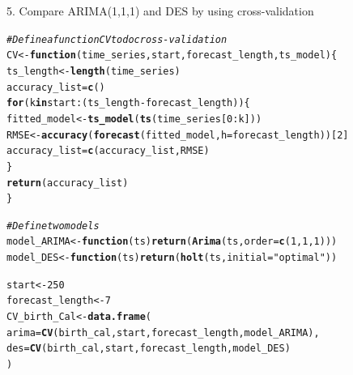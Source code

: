 \documentclass[10pt]{article}\usepackage[]{graphicx}\usepackage[]{color}
\makeatletter
\newcommand{\hlnum}[1]{\textcolor[rgb]{0.686,0.059,0.569}{#1}}%
\newcommand{\hlstr}[1]{\textcolor[rgb]{0.192,0.494,0.8}{#1}}%
\newcommand{\hlcom}[1]{\textcolor[rgb]{0.678,0.584,0.686}{\textit{#1}}}%
\newcommand{\hlopt}[1]{\textcolor[rgb]{0,0,0}{#1}}%
\newcommand{\hlstd}[1]{\textcolor[rgb]{0.345,0.345,0.345}{#1}}%
\newcommand{\hlkwa}[1]{\textcolor[rgb]{0.161,0.373,0.58}{\textbf{#1}}}%
\newcommand{\hlkwb}[1]{\textcolor[rgb]{0.69,0.353,0.396}{#1}}%
\newcommand{\hlkwc}[1]{\textcolor[rgb]{0.333,0.667,0.333}{#1}}%
\newcommand{\hlkwd}[1]{\textcolor[rgb]{0.737,0.353,0.396}{\textbf{#1}}}%
\newenvironment{kframe}{%
 \def\at@end@of@kframe{}%
 \ifinner\ifhmode%
  \def\at@end@of@kframe{\end{minipage}}%
  \begin{minipage}{\columnwidth}%
 \fi\fi%
 \def\FrameCommand##1{\hskip\@totalleftmargin \hskip-\fboxsep
 \colorbox{shadecolor}{##1}\hskip-\fboxsep
     \hskip-\linewidth \hskip-\@totalleftmargin \hskip\columnwidth}%
 \MakeFramed {\advance\hsize-\width
   \@totalleftmargin\z@ \linewidth\hsize
   \@setminipage}}%
 {\par\unskip\endMakeFramed%
 \at@end@of@kframe}
\newenvironment{knitrout}{}{} %
\makeatother
\begin{document}
5. Compare ARIMA(1,1,1) and DES by using cross-validation
\begin{knitrout}
\color{fgcolor}\begin{kframe}
\begin{alltt}
\hlcom{#Define a function CV to do cross-validation}
\hlstd{CV} \hlkwb{<-}  \hlkwa{function}\hlstd{(}\hlkwc{time_series}\hlstd{,} \hlkwc{start}\hlstd{,} \hlkwc{forecast_length}\hlstd{,}\hlkwc{ts_model}\hlstd{)\{}
  \hlstd{ts_length} \hlkwb{<-}  \hlkwd{length}\hlstd{(time_series)}
  \hlstd{accuracy_list} \hlkwb{=} \hlkwd{c}\hlstd{()}
  \hlkwa{for}\hlstd{(k} \hlkwa{in} \hlstd{start}\hlopt{:}\hlstd{(ts_length} \hlopt{-} \hlstd{forecast_length))\{}
    \hlstd{fitted_model} \hlkwb{<-} \hlkwd{ts_model}\hlstd{(}\hlkwd{ts}\hlstd{(time_series[}\hlnum{0}\hlopt{:}\hlstd{k]))}
    \hlstd{RMSE} \hlkwb{<-}  \hlkwd{accuracy}\hlstd{(}\hlkwd{forecast}\hlstd{(fitted_model,} \hlkwc{h} \hlstd{= forecast_length))[}\hlnum{2}\hlstd{]}
    \hlstd{accuracy_list} \hlkwb{=} \hlkwd{c}\hlstd{(accuracy_list, RMSE)}
  \hlstd{\}}
  \hlkwd{return}\hlstd{(accuracy_list)}
\hlstd{\}}

\hlcom{#Define two models}
\hlstd{model_ARIMA} \hlkwb{<-} \hlkwa{function}\hlstd{(}\hlkwc{ts}\hlstd{)} \hlkwd{return}\hlstd{(}\hlkwd{Arima}\hlstd{(ts,}\hlkwc{order} \hlstd{=} \hlkwd{c}\hlstd{(}\hlnum{1}\hlstd{,}\hlnum{1}\hlstd{,}\hlnum{1}\hlstd{)))}
\hlstd{model_DES} \hlkwb{<-} \hlkwa{function}\hlstd{(}\hlkwc{ts}\hlstd{)} \hlkwd{return}\hlstd{(}\hlkwd{holt}\hlstd{(ts,}\hlkwc{initial} \hlstd{=} \hlstr{"optimal"}\hlstd{))}

\hlstd{start} \hlkwb{<-} \hlnum{250}
\hlstd{forecast_length} \hlkwb{<-} \hlnum{7}
\hlstd{CV_birth_Cal} \hlkwb{<-} \hlkwd{data.frame}\hlstd{(}
  \hlkwc{arima} \hlstd{=} \hlkwd{CV}\hlstd{(birth_cal, start, forecast_length, model_ARIMA),}
  \hlkwc{des} \hlstd{=} \hlkwd{CV}\hlstd{(birth_cal, start, forecast_length, model_DES)}
\hlstd{)}


\end{alltt}
\end{kframe}
\end{knitrout}
\end{document}

